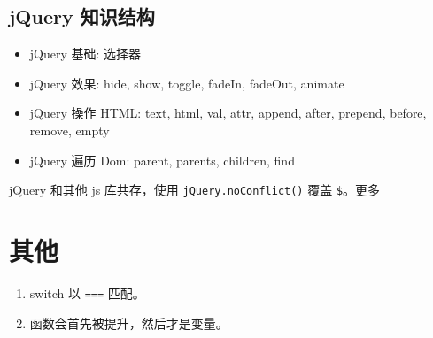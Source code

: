 \subsection{jQuery 知识结构}\hypertarget{jquery-}{}\label{jquery-}

\begin{itemize}
\item jQuery 基础: 选择器
\item jQuery 效果: hide, show, toggle, fadeIn, fadeOut, animate
\item jQuery 操作 HTML: text, html, val, attr, append, after, prepend, before, remove, empty
\item jQuery 遍历 Dom: parent, parents, children, find
\end{itemize}

jQuery 和其他 js 库共存，使用 \texttt{jQuery.noConflict()} 覆盖 \texttt{\$}。\href{http://www.cnblogs.com/lostyu/p/3534751.html}{更多}

\section{其他}\hypertarget{section-12}{}\label{section-12}

\begin{enumerate}
\item switch 以 \texttt{===} 匹配。
\item 函数会首先被提升，然后才是变量。
\end{enumerate}
